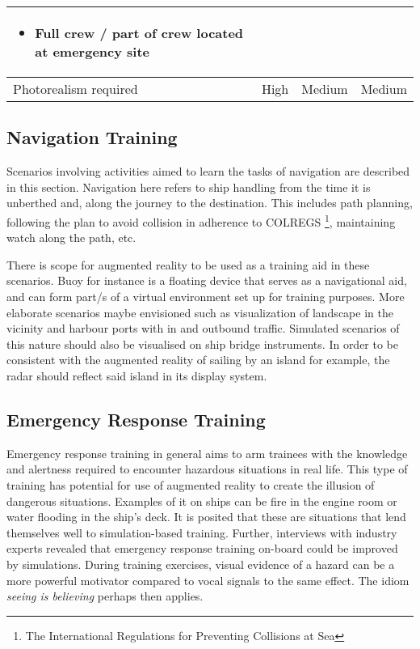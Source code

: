 \begin{table}
\begin{tabular}{@{}p{2.2cm}|p{3.3cm}|p{3.2cm}|p{3.3cm}|@{}}
\begin{itemize}[leftmargin=*,topsep=0pt,align=left,itemsep=0.25pt,after=]
			\item Full crew / part of crew located at emergency site
		\end{itemize} \\
		\hline
		Photorealism required & High & Medium & Medium \\
		\bottomrule
	\end{tabular}
\end{table}

\subsection{Navigation Training}

Scenarios involving activities aimed to learn the tasks of navigation are described in this section. Navigation here refers to ship handling from the time it is unberthed and, along the journey to the destination. This includes path planning, following the plan to avoid collision in adherence to COLREGS \footnote{The International Regulations for Preventing Collisions at Sea}, maintaining watch along the path, etc. 

There is scope for augmented reality to be used as a training aid in these scenarios. Buoy for instance is a floating device that serves as a navigational aid, and can form part/s of a virtual environment set up for training purposes. More elaborate scenarios maybe envisioned such as visualization of landscape in the vicinity and harbour ports with in and outbound traffic. Simulated scenarios of this nature should also be visualised on ship bridge instruments. In order to be consistent with the augmented reality of sailing by an island for example, the radar should reflect said island in its display system. 

\subsection{Emergency Response Training}

Emergency response training in general aims to arm trainees with the knowledge and alertness required to encounter hazardous situations in real life. This type of training has potential for use of augmented reality to create the illusion of dangerous situations. Examples of it on ships can be fire in the engine room or water flooding in the ship's deck. It is posited that these are situations that lend themselves well to simulation-based training. Further, interviews with industry experts revealed that emergency response training on-board could be improved by simulations. During training exercises, visual evidence of a hazard can be a more powerful motivator compared to vocal signals to the same effect. The idiom \textit{seeing is believing} perhaps then applies.


